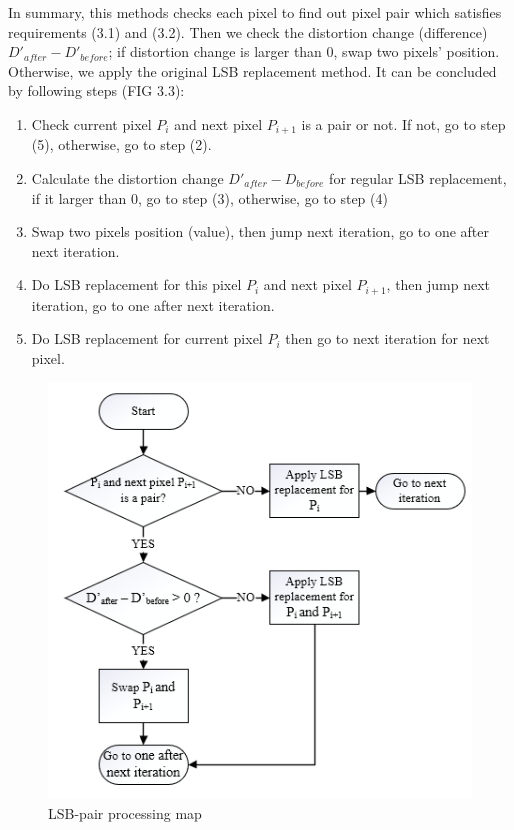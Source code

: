 In summary, this methods checks each pixel to find out pixel pair which satisfies requirements (3.1) and (3.2). Then we check the distortion change (difference) \(D'_{after} - D'_{before}\); if distortion change is larger than 0, swap two pixels' position. Otherwise, we apply the original LSB replacement method. It can be concluded by following steps (FIG 3.3):
\begin{enumerate}
\item Check current pixel \(P_{i}\) and next pixel \(P_{i+1}\) is a pair or not. If not, go to step (5), otherwise, go to step (2).
\item Calculate the distortion change \(D'_{after} - D_{before}\) for regular LSB replacement, if it larger than 0, go to step (3), otherwise, go to step (4)
\item Swap two pixels position (value), then jump next iteration, go to one after next iteration.
\item Do LSB replacement for this pixel \(P_{i}\) and next pixel \(P_{i+1}\), then jump next iteration, go to one after next iteration.
\item Do LSB replacement for current pixel \(P_{i}\) then go to next iteration for next pixel.
\end{enumerate}




\begin{figure}[h]
\includegraphics[width=\columnwidth]{image/processing_map.PNG}
\caption{LSB-pair processing map}
\label{fig:figure}
\end{figure}


